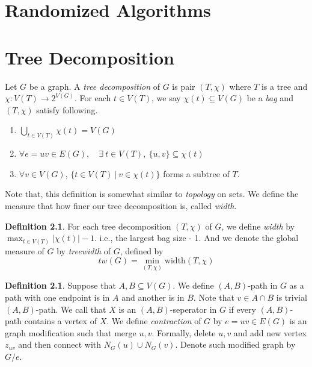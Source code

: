 \documentclass[12pt, a4paper, openany, twoside]{book}
\theoremstyle{definition}
\newtheorem{defn}[thm]{Definition}
\theoremstyle{remark}
\theoremstyle{plain}
\numberwithin{equation}{section}
\begin{document}
\chapter{Randomized Algorithms}

\chapter{Tree Decomposition}

\begin{tcolorbox}[colback=yellow!10!white,colframe=brown!75!black,title=Tree Decomposition]
Let $G$ be a graph. A \textit{tree decomposition} of $G$ is pair $(T, \chi)$ where $T$ is a tree 
and $\chi: V(T) \rightarrow 2^{V(G)}$. For each $t \in V(T)$, we say $\chi(t) \subseteq V(G)$ be a \textit{bag} and $(T, \chi)$ satisfy following. 
\begin{enumerate}
    \item $\bigcup_{t \in V(T)} \chi(t) = V(G)$
    \item $\forall e = uv \in E(G), \quad \exists ~ t \in V(T), ~ \{u,v\} \subseteq \chi(t)$
    \item $\forall v \in V(G)$, $\{t \in V(T)~|~ v \in \chi(t)\}$ forms a subtree of $T$. 
\end{enumerate}
\end{tcolorbox}

Note that, this definition is somewhat similar to \textit{topology} on sets. We define the measure that how finer our tree decomposition is, called \textit{width}. 

\begin{defn}
For each tree decomposition $(T, \chi)$ of $G$, we define \textit{width} by $\max_{t \in V(T)} |\chi(t)| - 1$. 
i.e., the largest bag size - 1. And we denote the global measure of $G$ by \textit{treewidth} of $G$, defined by 
\[tw(G) = \min_{(T, \chi)} \text{width}(T, \chi)\]
\end{defn}

\begin{defn}
Suppose that $A, B \subseteq V(G)$. We define $(A,B)$-path in $G$ as a path with one endpoint is in $A$ and another is in $B$. 
Note that $v \in A \cap B$ is trivial $(A, B)$-path. We call that $X$ is an $(A,B)$-seperator in $G$ if 
every $(A, B)$-path contains a vertex of $X$. We define \textit{contraction} of $G$ by $e = uv \in E(G)$ is an graph modification such that 
merge $u, v$. Formally, delete $u, v$ and add new vertex $z_{uv}$ and then connect with $N_G(u) \cup N_G(v)$. Denote such modified graph by $G/e$. 
\end{defn}
\end{document}
